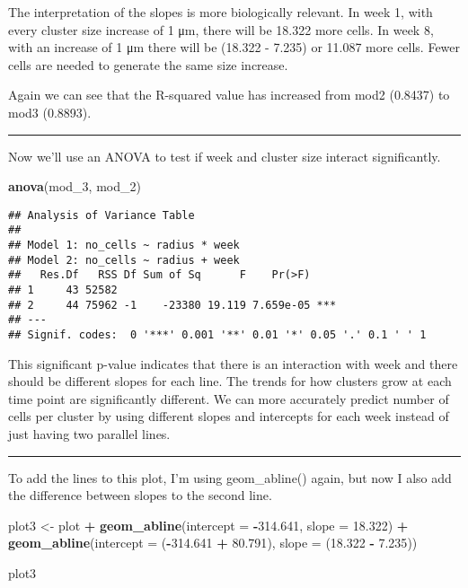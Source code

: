 \documentclass[]{article}
\newenvironment{Shaded}{\begin{snugshade}}{\end{snugshade}}
\newcommand{\KeywordTok}[1]{\textcolor[rgb]{0.13,0.29,0.53}{\textbf{#1}}}
\newcommand{\DataTypeTok}[1]{\textcolor[rgb]{0.13,0.29,0.53}{#1}}
\newcommand{\DecValTok}[1]{\textcolor[rgb]{0.00,0.00,0.81}{#1}}
\newcommand{\FloatTok}[1]{\textcolor[rgb]{0.00,0.00,0.81}{#1}}
\newcommand{\StringTok}[1]{\textcolor[rgb]{0.31,0.60,0.02}{#1}}
\newcommand{\OperatorTok}[1]{\textcolor[rgb]{0.81,0.36,0.00}{\textbf{#1}}}
\newcommand{\NormalTok}[1]{#1}
\begin{document}
The interpretation of the slopes is more biologically relevant. In week
1, with every cluster size increase of 1 μm, there will be 18.322 more
cells. In week 8, with an increase of 1 μm there will be (18.322 -
7.235) or 11.087 more cells. Fewer cells are needed to generate the same
size increase.

Again we can see that the R-squared value has increased from mod2
(0.8437) to mod3 (0.8893).

\begin{center}\rule{0.5\linewidth}{\linethickness}\end{center}

Now we'll use an ANOVA to test if week and cluster size interact
significantly.

\begin{Shaded}
\begin{Highlighting}[]
\KeywordTok{anova}\NormalTok{(mod_}\DecValTok{3}\NormalTok{, mod_}\DecValTok{2}\NormalTok{)}
\end{Highlighting}
\end{Shaded}

\begin{verbatim}
## Analysis of Variance Table
## 
## Model 1: no_cells ~ radius * week
## Model 2: no_cells ~ radius + week
##   Res.Df   RSS Df Sum of Sq      F    Pr(>F)    
## 1     43 52582                                  
## 2     44 75962 -1    -23380 19.119 7.659e-05 ***
## ---
## Signif. codes:  0 '***' 0.001 '**' 0.01 '*' 0.05 '.' 0.1 ' ' 1
\end{verbatim}

This significant p-value indicates that there is an interaction with
week and there should be different slopes for each line. The trends for
how clusters grow at each time point are significantly different. We can
more accurately predict number of cells per cluster by using different
slopes and intercepts for each week instead of just having two parallel
lines.

\begin{center}\rule{0.5\linewidth}{\linethickness}\end{center}

To add the lines to this plot, I'm using geom\_abline() again, but now I
also add the difference between slopes to the second line.

\begin{Shaded}
\begin{Highlighting}[]
\NormalTok{plot3 <-}\StringTok{ }\NormalTok{plot }\OperatorTok{+}\StringTok{ }
\StringTok{  }\KeywordTok{geom_abline}\NormalTok{(}\DataTypeTok{intercept =} \OperatorTok{-}\FloatTok{314.641}\NormalTok{, }\DataTypeTok{slope =} \FloatTok{18.322}\NormalTok{) }\OperatorTok{+}
\StringTok{  }\KeywordTok{geom_abline}\NormalTok{(}\DataTypeTok{intercept =}\NormalTok{ (}\OperatorTok{-}\FloatTok{314.641} \OperatorTok{+}\StringTok{ }\FloatTok{80.791}\NormalTok{), }\DataTypeTok{slope =}\NormalTok{ (}\FloatTok{18.322} \OperatorTok{-}\StringTok{ }\FloatTok{7.235}\NormalTok{))}

\NormalTok{plot3}
\end{Highlighting}
\end{Shaded}
\end{document}
